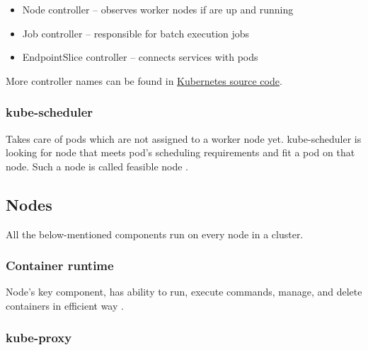 \begin{itemize}
    \item Node controller -- observes worker nodes if are up and running
    \item Job controller -- responsible for batch execution jobs
    \item EndpointSlice controller -- connects services with pods
\end{itemize}

More controller names can be found in \href{https://github.com/kubernetes/kubernetes/blob/master/cmd/kube-controller-manager/names/controller_names.go}{Kubernetes source code}.


\subsubsection{kube-scheduler}
\label{sec:kubeScheduler}

Takes care of pods which are not assigned to a worker node yet. kube-scheduler is looking for node that meets pod's scheduling requirements and fit a pod on that node. Such a node is called feasible node \cite{KubernetesScheduler}.


\subsection{Nodes}
\label{sec:k8sNodes}
All the below-mentioned components run on every node in a cluster.

\subsubsection{Container runtime}
\label{sec:containerRuntime}

Node's key component, has ability to run, execute commands, manage, and delete containers in efficient way \cite{KubernetesArch}. 



\subsubsection{kube-proxy}
\label{sec:kubeProxy}

